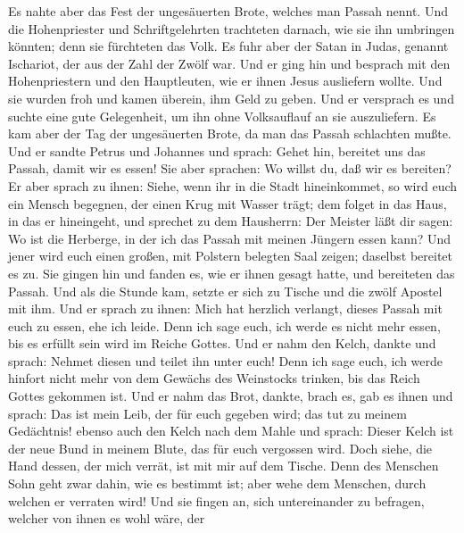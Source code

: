  Es nahte aber das Fest der ungesäuerten Brote, welches
man Passah nennt.  Und die Hohenpriester und
Schriftgelehrten trachteten darnach, wie sie ihn umbringen könnten; denn
sie fürchteten das Volk.  Es fuhr aber der Satan in Judas,
genannt Ischariot, der aus der Zahl der Zwölf war.  Und er
ging hin und besprach mit den Hohenpriestern und den Hauptleuten, wie er
ihnen Jesus ausliefern wollte.  Und sie wurden froh und
kamen überein, ihm Geld zu geben.  Und er versprach es und
suchte eine gute Gelegenheit, um ihn ohne Volksauflauf an sie
auszuliefern.  Es kam aber der Tag der ungesäuerten Brote,
da man das Passah schlachten mußte.  Und er sandte Petrus
und Johannes und sprach: Gehet hin, bereitet uns das Passah, damit wir
es essen!  Sie aber sprachen: Wo willst du, daß wir es
bereiten?  Er aber sprach zu ihnen: Siehe, wenn ihr in
die Stadt hineinkommet, so wird euch ein Mensch begegnen, der einen Krug
mit Wasser trägt; dem folget in das Haus, in das er hineingeht,
 und sprechet zu dem Hausherrn: Der Meister läßt dir
sagen: Wo ist die Herberge, in der ich das Passah mit meinen Jüngern
essen kann?  Und jener wird euch einen großen, mit
Polstern belegten Saal zeigen; daselbst bereitet es zu. 
Sie gingen hin und fanden es, wie er ihnen gesagt hatte, und bereiteten
das Passah.  Und als die Stunde kam, setzte er sich zu
Tische und die zwölf Apostel mit ihm.  Und er sprach zu
ihnen: Mich hat herzlich verlangt, dieses Passah mit euch zu essen, ehe
ich leide.  Denn ich sage euch, ich werde es nicht mehr
essen, bis es erfüllt sein wird im Reiche Gottes.  Und er
nahm den Kelch, dankte und sprach: Nehmet diesen und teilet ihn unter
euch!  Denn ich sage euch, ich werde hinfort nicht mehr
von dem Gewächs des Weinstocks trinken, bis das Reich Gottes gekommen
ist.  Und er nahm das Brot, dankte, brach es, gab es
ihnen und sprach: Das ist mein Leib, der für euch gegeben wird; das tut
zu meinem Gedächtnis!  ebenso auch den Kelch nach dem
Mahle und sprach: Dieser Kelch ist der neue Bund in meinem Blute, das
für euch vergossen wird.  Doch siehe, die Hand dessen,
der mich verrät, ist mit mir auf dem Tische.  Denn des
Menschen Sohn geht zwar dahin, wie es bestimmt ist; aber wehe dem
Menschen, durch welchen er verraten wird!  Und sie fingen
an, sich untereinander zu befragen, welcher von ihnen es wohl wäre, der
